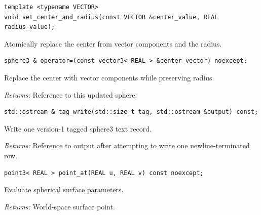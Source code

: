 \par\noindent\begin{minipage}{\linewidth}
\begin{lstlisting}[style=apireference]
template <typename VECTOR>
void set_center_and_radius(const VECTOR &center_value, REAL radius_value);
\end{lstlisting}
{\footnotesize Atomically replace the center from vector components and the radius.\par}
\end{minipage}\par\vspace{1pt}
\par\noindent\begin{minipage}{\linewidth}
\begin{lstlisting}[style=apireference]
sphere3 & operator=(const vector3< REAL > &center_vector) noexcept;
\end{lstlisting}
{\footnotesize Replace the center with vector components while preserving radius.\par}
{\footnotesize\textit{Returns:} Reference to this updated sphere.\par}
\end{minipage}\par\vspace{1pt}
\par\noindent\begin{minipage}{\linewidth}
\begin{lstlisting}[style=apireference]
std::ostream & tag_write(std::size_t tag, std::ostream &output) const;
\end{lstlisting}
{\footnotesize Write one version-1 tagged sphere3 text record.\par}
{\footnotesize\textit{Returns:} Reference to output after attempting to write one newline-terminated row.\par}
\end{minipage}\par\vspace{1pt}
\par\noindent\begin{minipage}{\linewidth}
\begin{lstlisting}[style=apireference]
point3< REAL > point_at(REAL u, REAL v) const noexcept;
\end{lstlisting}
{\footnotesize Evaluate spherical surface parameters.\par}
{\footnotesize\textit{Returns:} World-space surface point.\par}
\end{minipage}\par\vspace{1pt}
